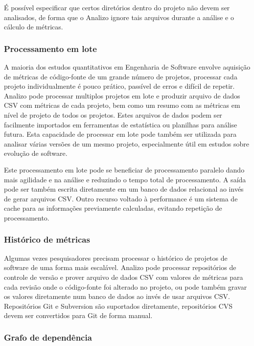 É possível especificar que certos diretórios dentro do projeto não devem ser
analisados, de forma que o Analizo ignore tais arquivos durante a análise e o
cálculo de métricas.

\subsubsection{Processamento em lote}\label{lote}

A maioria dos estudos quantitativos em Engenharia de Software envolve aquisição
de métricas de código-fonte de um grande número de projetos, processar cada
projeto individualmente é pouco prático, passível de erros e difícil de
repetir. Analizo pode processar multiplos projetos em lote e produzir arquivo
de dados CSV com métricas de cada projeto, bem como um resumo com as métricas
em nível de projeto de todos os projetos. Estes arquivos de dados podem ser
facilmente importados em ferramentas de estatística ou planilhas para análise
futura. Esta capacidade de processar em lote pode também ser utilizada para
analisar várias versões de um mesmo projeto, especialmente útil em estudos
sobre evolução de software.

Este processamento em lote pode se beneficiar de processamento paralelo dando
mais agilidade e na análise e reduzindo o tempo total de processamento.  A
saída pode ser também escrita diretamente em um banco de dados relacional ao
invés de gerar arquivos CSV. Outro recurso voltado à performance é um sistema
de cache para as informações previamente calculadas, evitando repetição de
processamento.

\subsubsection{Histórico de métricas}

Algumas vezes pesquisadores precisam processar o histórico de projetos de
software de uma forma mais escalável. Analizo pode processar repositórios de
controle de versão e prover arquivo de dados CSV com valores de métricas para
cada revisão onde o código-fonte foi alterado no projeto, ou pode também gravar
os valores diretamente num banco de dados ao invés de usar arquivos CSV. Repositórios Git e
Subversion são suportados diretamente, repositórios CVS devem ser convertidos
para Git de forma manual.

\subsubsection{Grafo de dependência}

